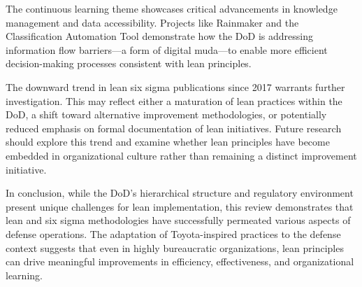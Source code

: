 \documentclass{article}
\begin{document}
	The continuous learning theme showcases critical advancements in knowledge management and data accessibility.
	Projects like Rainmaker and the Classification Automation Tool demonstrate how the DoD is addressing information flow barriers—a form of digital muda—to enable more efficient decision-making processes consistent with lean principles.

	The downward trend in lean six sigma publications since 2017 warrants further investigation. 
	This may reflect either a maturation of lean practices within the DoD, a shift toward alternative improvement methodologies, or potentially reduced emphasis on formal documentation of lean initiatives. 
	Future research should explore this trend and examine whether lean principles have become embedded in organizational culture rather than remaining a distinct improvement initiative.

	In conclusion, while the DoD's hierarchical structure and regulatory environment present unique challenges for lean implementation, this review demonstrates that lean and six sigma methodologies have successfully permeated various aspects of defense operations. 
	The adaptation of Toyota-inspired practices to the defense context suggests that even in highly bureaucratic organizations, lean principles can drive meaningful improvements in efficiency, effectiveness, and organizational learning.

	\newpage

	
	\nocite{*}
	
\end{document}
